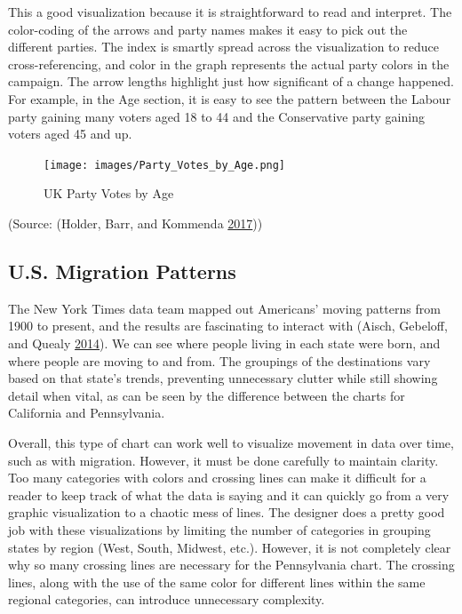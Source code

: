 \documentclass[]{book}
\begin{document}
This a good visualization because it is straightforward to read and interpret. The color-coding of the arrows and party names makes it easy to pick out the different parties. The index is smartly spread across the visualization to reduce cross-referencing, and color in the graph represents the actual party colors in the campaign. The arrow lengths highlight just how significant of a change happened. For example, in the Age section, it is easy to see the pattern between the Labour party gaining many voters aged 18 to 44 and the Conservative party gaining voters aged 45 and up.

\begin{figure}
\centering
\texttt{[image: images/Party\_Votes\_by\_Age.png]}
\caption{UK Party Votes by Age}
\end{figure}

(Source: (Holder, Barr, and Kommenda \protect\hyperlink{ref-UKvotes2017}{2017}))

\hypertarget{u.s.-migration-patterns}{%
\subsection{U.S. Migration Patterns}\label{u.s.-migration-patterns}}

The New York Times data team mapped out Americans' moving patterns from 1900 to present, and the results are fascinating to interact with (Aisch, Gebeloff, and Quealy \protect\hyperlink{ref-migration}{2014}). We can see where people living in each state were born, and where people are moving to and from. The groupings of the destinations vary based on that state's trends, preventing unnecessary clutter while still showing detail when vital, as can be seen by the difference between the charts for California and Pennsylvania.

Overall, this type of chart can work well to visualize movement in data over time, such as with migration. However, it must be done carefully to maintain clarity. Too many categories with colors and crossing lines can make it difficult for a reader to keep track of what the data is saying and it can quickly go from a very graphic visualization to a chaotic mess of lines. The designer does a pretty good job with these visualizations by limiting the number of categories in grouping states by region (West, South, Midwest, etc.). However, it is not completely clear why so many crossing lines are necessary for the Pennsylvania chart. The crossing lines, along with the use of the same color for different lines within the same regional categories, can introduce unnecessary complexity.
\end{document}
